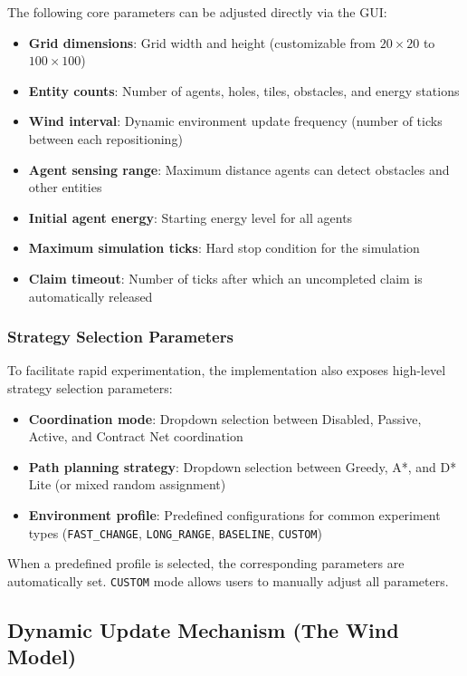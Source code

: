\documentclass[titlepage=formal,code=listings,logo=../../assets/火炬+英文校名-左右.pdf]{../../SUSTechHomework}
\begin{document}
The following core parameters can be adjusted directly via the GUI:

\begin{itemize}
  \item \textbf{Grid dimensions}: Grid width and height (customizable from $20\times 20$ to $100\times 100$)
  \item \textbf{Entity counts}: Number of agents, holes, tiles, obstacles, and energy stations
  \item \textbf{Wind interval}: Dynamic environment update frequency (number of ticks between each repositioning)
  \item \textbf{Agent sensing range}: Maximum distance agents can detect obstacles and other entities
  \item \textbf{Initial agent energy}: Starting energy level for all agents
  \item \textbf{Maximum simulation ticks}: Hard stop condition for the simulation
  \item \textbf{Claim timeout}: Number of ticks after which an uncompleted claim is automatically released
\end{itemize}

\subsubsection{Strategy Selection Parameters}

To facilitate rapid experimentation, the implementation also exposes high-level strategy selection parameters:

\begin{itemize}
  \item \textbf{Coordination mode}: Dropdown selection between Disabled, Passive, Active, and Contract Net coordination
  \item \textbf{Path planning strategy}: Dropdown selection between Greedy, A*, and D* Lite (or mixed random assignment)
  \item \textbf{Environment profile}: Predefined configurations for common experiment types (\texttt{FAST\_CHANGE}, \texttt{LONG\_RANGE}, \texttt{BASELINE}, \texttt{CUSTOM})
\end{itemize}

When a predefined profile is selected, the corresponding parameters are automatically set. \texttt{CUSTOM} mode allows users to manually adjust all parameters.

\subsection{Dynamic Update Mechanism (The Wind Model)}
\end{document}
